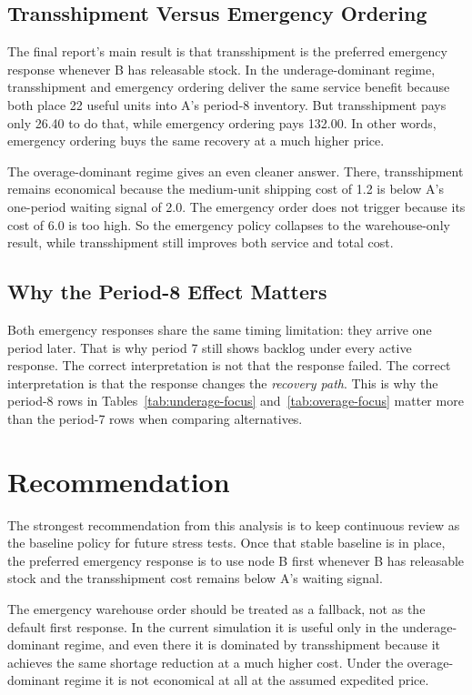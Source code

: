 \documentclass[11pt]{article}
\begin{document}
\subsection{Transshipment Versus Emergency Ordering}
The final report's main result is that transshipment is the preferred emergency response whenever B has releasable stock. In the underage-dominant regime, transshipment and emergency ordering deliver the same service benefit because both place 22 useful units into A's period-8 inventory. But transshipment pays only 26.40 to do that, while emergency ordering pays 132.00. In other words, emergency ordering buys the same recovery at a much higher price.

The overage-dominant regime gives an even cleaner answer. There, transshipment remains economical because the medium-unit shipping cost of 1.2 is below A's one-period waiting signal of 2.0. The emergency order does not trigger because its cost of 6.0 is too high. So the emergency policy collapses to the warehouse-only result, while transshipment still improves both service and total cost.

\subsection{Why the Period-8 Effect Matters}
Both emergency responses share the same timing limitation: they arrive one period later. That is why period 7 still shows backlog under every active response. The correct interpretation is not that the response failed. The correct interpretation is that the response changes the \emph{recovery path}. This is why the period-8 rows in Tables~\ref{tab:underage-focus} and~\ref{tab:overage-focus} matter more than the period-7 rows when comparing alternatives.

\section{Recommendation}
The strongest recommendation from this analysis is to keep continuous review as the baseline policy for future stress tests. Once that stable baseline is in place, the preferred emergency response is to use node B first whenever B has releasable stock and the transshipment cost remains below A's waiting signal.

The emergency warehouse order should be treated as a fallback, not as the default first response. In the current simulation it is useful only in the underage-dominant regime, and even there it is dominated by transshipment because it achieves the same shortage reduction at a much higher cost. Under the overage-dominant regime it is not economical at all at the assumed expedited price.
\end{document}
